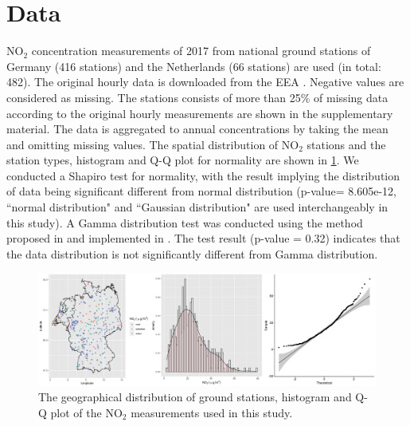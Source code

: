 \documentclass{article}
\begin{document}
 
\section{Data}
NO$_2$ concentration measurements of 2017 from national ground stations of Germany (416 stations) and the Netherlands (66 stations) are used (in total: 482). The original hourly data is downloaded from the EEA \citep[European Environment Agency,][]{nelson1999european,EEA}. Negative values are considered as missing. The stations consists of  more than 25\% of missing data according to the original hourly measurements are shown in the supplementary material.  The data is aggregated to annual concentrations by taking the mean and omitting missing values. The spatial distribution of NO$_2$ stations and the station types, histogram and Q-Q plot for normality are shown in \cref{fig:histqq}. %
We conducted a Shapiro test for normality, with the result implying the distribution of data being significant different from normal distribution (p-value= 8.605e-12, ``normal distribution" and ``Gaussian distribution" are used interchangeably in this study).
A Gamma distribution test was conducted using the method proposed in \cite{villasenor2015variance} and implemented in \cite{goft}.  The test result (p-value = 0.32) indicates that the data distribution is not significantly different from Gamma distribution.

\begin{figure}
    \centering
    \includegraphics[scale=0.06]{fig/histqq_NO2.png}
    \caption{The geographical distribution of ground stations, histogram and Q-Q plot of the NO$_2$ measurements used in this study.}
    \label{fig:histqq}
\end{figure}{}
\end{document}
